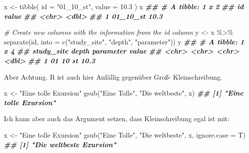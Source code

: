 \documentclass[
]{article}
\newenvironment{Shaded}{\begin{snugshade}}{\end{snugshade}}
\newcommand{\AttributeTok}[1]{\textcolor[rgb]{0.77,0.63,0.00}{#1}}
\newcommand{\CommentTok}[1]{\textcolor[rgb]{0.56,0.35,0.01}{\textit{#1}}}
\newcommand{\DocumentationTok}[1]{\textcolor[rgb]{0.56,0.35,0.01}{\textbf{\textit{#1}}}}
\newcommand{\FloatTok}[1]{\textcolor[rgb]{0.00,0.00,0.81}{#1}}
\newcommand{\FunctionTok}[1]{\textcolor[rgb]{0.00,0.00,0.00}{#1}}
\newcommand{\NormalTok}[1]{#1}
\newcommand{\OtherTok}[1]{\textcolor[rgb]{0.56,0.35,0.01}{#1}}
\newcommand{\SpecialCharTok}[1]{\textcolor[rgb]{0.00,0.00,0.00}{#1}}
\newcommand{\StringTok}[1]{\textcolor[rgb]{0.31,0.60,0.02}{#1}}
\begin{document}
\begin{Shaded}
\begin{Highlighting}[]

\NormalTok{x }\OtherTok{\textless{}{-}} \FunctionTok{tibble}\NormalTok{(}
  \AttributeTok{id =} \StringTok{"01\_10\_st"}\NormalTok{,}
  \AttributeTok{value =} \FloatTok{10.3}
\NormalTok{)}
\NormalTok{x}
\DocumentationTok{\#\# \# A tibble: 1 x 2}
\DocumentationTok{\#\#   id       value}
\DocumentationTok{\#\#   \textless{}chr\textgreater{}    \textless{}dbl\textgreater{}}
\DocumentationTok{\#\# 1 01\_10\_st  10.3}

\CommentTok{\# Create new columns with the information from the id column}
\NormalTok{y }\OtherTok{\textless{}{-}}\NormalTok{ x }\SpecialCharTok{\%\textgreater{}\%}
  \FunctionTok{separate}\NormalTok{(id, }\AttributeTok{into =} \FunctionTok{c}\NormalTok{(}\StringTok{"study\_site"}\NormalTok{, }\StringTok{"depth"}\NormalTok{, }\StringTok{"parameter"}\NormalTok{))}
\NormalTok{y}
\DocumentationTok{\#\# \# A tibble: 1 x 4}
\DocumentationTok{\#\#   study\_site depth parameter value}
\DocumentationTok{\#\#   \textless{}chr\textgreater{}      \textless{}chr\textgreater{} \textless{}chr\textgreater{}     \textless{}dbl\textgreater{}}
\DocumentationTok{\#\# 1 01         10    st         10.3}
\end{Highlighting}
\end{Shaded}

Aber Achtung. R ist auch hier Anfällig gegenüber Groß- Kleinschreibung.

\begin{Shaded}
\begin{Highlighting}[]
\NormalTok{x }\OtherTok{\textless{}{-}} \StringTok{"Eine tolle Exursion"}
\FunctionTok{gsub}\NormalTok{(}\StringTok{"Eine Tolle"}\NormalTok{, }\StringTok{"Die weltbeste"}\NormalTok{, x)}
\DocumentationTok{\#\# [1] "Eine tolle Exursion"}
\end{Highlighting}
\end{Shaded}

Ich kann aber auch das Argument setzen, dass Kleinschreibung egal ist mit:

\begin{Shaded}
\begin{Highlighting}[]
\NormalTok{x }\OtherTok{\textless{}{-}} \StringTok{"Eine tolle Exursion"}
\FunctionTok{gsub}\NormalTok{(}\StringTok{"Eine Tolle"}\NormalTok{, }\StringTok{"Die weltbeste"}\NormalTok{, x, }\AttributeTok{ignore.case =}\NormalTok{ T)}
\DocumentationTok{\#\# [1] "Die weltbeste Exursion"}
\end{Highlighting}
\end{Shaded}
\end{document}
